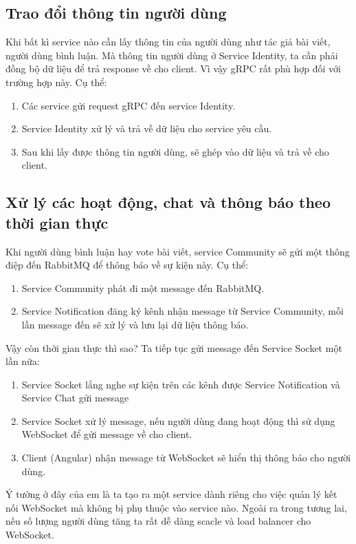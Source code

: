 \documentclass[../index.tex]{subfiles}
\begin{document}
    \subsection{Trao đổi thông tin người dùng}
    Khi bất kì service nào cần lấy thông tin của người dùng như tác giả bài viết, người dùng bình luận. Mà thông tin người dùng ở Service Identity, ta cần phải đồng bộ dữ liệu để trả response về cho client. Vì vậy gRPC rất phù hợp đối với trường hợp này. Cụ thể:
    \begin{enumerate}
        \item Các service gửi request gRPC đến service Identity.
        \item Service Identity xử lý và trả về dữ liệu cho service yêu cầu.
        \item Sau khi lấy được thông tin người dùng, sẽ ghép vào dữ liệu và trả về cho client.
    \end{enumerate}
    
    \subsection{Xử lý các hoạt động, chat và thông báo theo thời gian thực}
    Khi người dùng bình luận hay vote bài viết, service Community sẽ gửi một thông điệp đến RabbitMQ để thông báo về sự kiện này. Cụ thể:
    \begin{enumerate}
        \item Service Community phát đi một message đến RabbitMQ.
        \item Service Notification đăng ký kênh nhận message từ Service Community, mỗi lần message đến sẽ xử lý và lưu lại dữ liệu thông báo.
    \end{enumerate}
    Vậy còn thời gian thực thì sao? Ta tiếp tục gửi message đến Service Socket một lần nữa:
    \begin{enumerate}
        \item Service Socket lắng nghe sự kiện trên các kênh được Service Notification và Service Chat gửi message
        \item Service Socket xử lý message, nếu người dùng đang hoạt động thì sử dụng WebSocket để gửi message về cho client.
        \item Client (Angular) nhận message từ WebSocket sẽ hiển thị thông báo cho người dùng. 
    \end{enumerate}
    Ý tưởng ở đây của em là ta tạo ra một service dành riêng cho việc quản lý kết nối WebSocket mà không bị phụ thuộc vào service nào. Ngoài ra trong tương lai, nếu số lượng người dùng tăng ta rất dễ dàng scacle và load balancer cho WebSocket.
    
\end{document}
